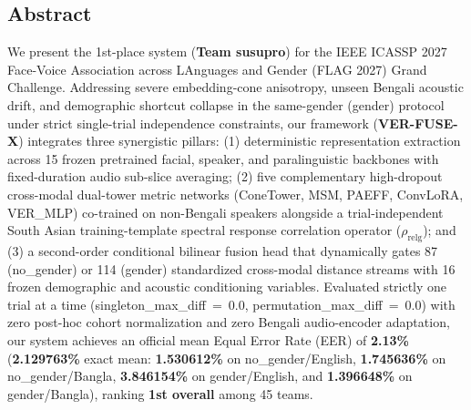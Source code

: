 \documentclass[10pt,letterpaper]{article}
\begin{document}
\ninept
{}
\subsection*{Abstract}\label{abstract}

We present the 1st-place system (\textbf{Team \textnormal{susupro}}) for the IEEE ICASSP 2027 Face-Voice Association across LAnguages and Gender (FLAG 2027) Grand Challenge. Addressing severe embedding-cone anisotropy, unseen Bengali acoustic drift, and demographic shortcut collapse in the same-gender (\textnormal{gender}) protocol under strict single-trial independence constraints, our framework (\textbf{VER-FUSE-X}) integrates three synergistic pillars: (1) deterministic representation extraction across 15 frozen pretrained facial, speaker, and paralinguistic backbones with fixed-duration audio sub-slice averaging; (2) five complementary high-dropout cross-modal dual-tower metric networks (\textnormal{ConeTower}, \textnormal{MSM}, \textnormal{PAEFF}, \textnormal{ConvLoRA}, \textnormal{VER\_\allowbreak{}MLP}) co-trained on non-Bengali speakers alongside a trial-independent South Asian training-template spectral response correlation operator (\(\rho_{\text{relg}}\)); and (3) a second-order conditional bilinear fusion head that dynamically gates 87 (\textnormal{no\_\allowbreak{}gender}) or 114 (\textnormal{gender}) standardized cross-modal distance streams with 16 frozen demographic and acoustic conditioning variables. Evaluated strictly one trial at a time (\textnormal{singleton\_\allowbreak{}max\_\allowbreak{}diff\ =\ 0.0}, \textnormal{permutation\_\allowbreak{}max\_\allowbreak{}diff\ =\ 0.0}) with zero post-hoc cohort normalization and zero Bengali audio-encoder adaptation, our system achieves an official mean Equal Error Rate (EER) of \textbf{2.13\%} (\textbf{2.129763\%} exact mean: \textbf{1.530612\%} on \textnormal{no\_\allowbreak{}gender/English}, \textbf{1.745636\%} on \textnormal{no\_\allowbreak{}gender/Bangla}, \textbf{3.846154\%} on \textnormal{gender/English}, and \textbf{1.396648\%} on \textnormal{gender/Bangla}), ranking \textbf{1st overall} among 45 teams.
\end{document}
